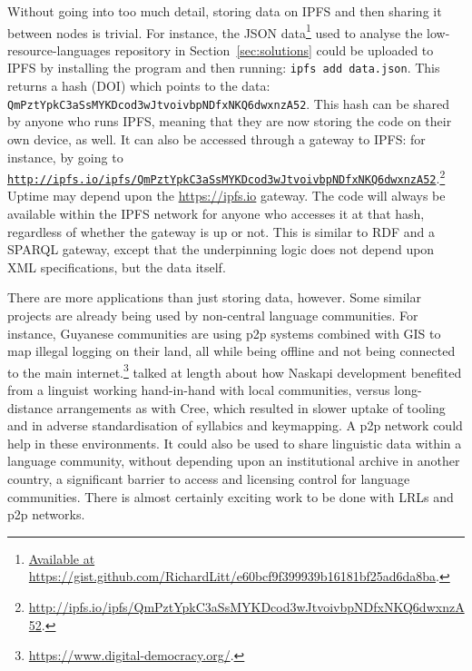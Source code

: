 Without going into too much detail, storing data on IPFS and then sharing it between nodes is trivial. For instance, the JSON data\footnote{\href{https://gist.github.com/RichardLitt/e60bcf9f399939b16181bf25ad6da8ba}{Available at https://gist.github.com/RichardLitt/e60bcf9f399939b16181bf25ad6da8ba}. } used to analyse the low-resource-languages repository in Section~\ref{sec:solutions} could be uploaded to IPFS by installing the program and then running: {\tt ipfs add data.json}. This returns a hash (DOI) which points to the data: {\tt QmPztYpkC3aSs\-MYKDcod\-3wJtvoivbp\-NDfxNKQ6dwxnzA52}. This hash can be shared by anyone who runs IPFS, meaning that they are now storing the code on their own device, as well. It can also be accessed through a gateway to IPFS: for instance, by going to \href{http://ipfs.io/ipfs/QmPztYpkC3aSsMYKDcod3wJtvoivbpNDfxNKQ6dwxnzA52}{\nolinkurl{http://ipfs.io/ipfs/QmPztYpkC3aSsMYKDcod3wJtvoivbpNDfxNKQ6dwxnzA52}}.\footnote{\href{http://ipfs.io/ipfs/QmPztYpkC3aSsMYKDcod3wJtvoivbpNDfxNKQ6dwxnzA52}{http://ipfs.io/ipfs/QmPztYpkC3aSsMYKDcod3wJtvoivbpNDfxNKQ6dwxnzA52}. } Uptime may depend upon the \href{https://ipfs.io}{https://ipfs.io} gateway. The code will always be available within the IPFS network for anyone who accesses it at that hash, regardless of whether the gateway is up or not. This is similar to RDF and a SPARQL gateway, except that the underpinning logic does not depend upon XML specifications, but the data itself.

There are more applications than just storing data, however. Some similar projects are already being used by non-central language communities. For instance, Guyanese communities are using p2p systems combined with GIS to map illegal logging on their land, all while being offline and not being connected to the main internet.\footnote{\href{https://www.digital-democracy.org/}{https://www.digital-democracy.org/}. } \citet[90]{jancewicz2002applied} talked at length about how Naskapi development benefited from a linguist working hand-in-hand with local communities, versus long-distance arrangements as with Cree, which resulted in slower uptake of tooling and in adverse standardisation of syllabics and keymapping. A p2p network could help in these environments. It could also be used to share linguistic data within a language community, without depending upon an institutional archive in another country, a significant barrier to access and licensing control for language communities. There is almost certainly exciting work to be done with LRLs and p2p networks.
